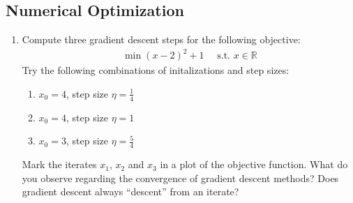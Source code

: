 \documentclass[letterpaper,10pt,english]{jupyterBook}
\begin{document}
\subsection{Numerical Optimization}
\label{\detokenize{optimization_exercises:numerical-optimization}}\begin{enumerate}
%
\item {} 
\sphinxAtStartPar
Compute three gradient descent steps for the following objective:
\begin{align*}\min (x-2)^2 + 1 \quad\text{ s.t. }x\in\mathbb{R}\end{align*}
\sphinxAtStartPar
Try the following combinations of initalizations and step sizes:
\begin{enumerate}
%
\item {} 
\sphinxAtStartPar
\(x_0=4\), step size \(\eta=\frac14\)

\item {} 
\sphinxAtStartPar
\(x_0=4\), step size \(\eta=1\)

\item {} 
\sphinxAtStartPar
\(x_0=3\), step size \(\eta=\frac54\)

\end{enumerate}

\sphinxAtStartPar
Mark the iterates \(x_1\), \(x_2\) and \(x_3\) in a plot of the objective function. What do you observe regarding the convergence of gradient descent methods? Does gradient descent always “descent” from an iterate?


\end{enumerate}
\end{document}
